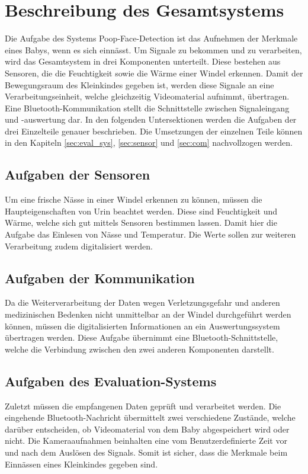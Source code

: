 \section{Beschreibung des Gesamtsystems}
\label{sec:Gesamtsystem}

Die Aufgabe des Systems Poop-Face-Detection ist das Aufnehmen der Merkmale eines Babys, wenn es sich einnässt. Um Signale zu bekommen und zu verarbeiten, wird das Gesamtsystem in drei Komponenten unterteilt. Diese bestehen aus Sensoren, die die Feuchtigkeit sowie die Wärme einer Windel erkennen. Damit der Bewegungsraum des Kleinkindes gegeben ist, werden diese Signale an eine Verarbeitungseinheit, welche gleichzeitig Videomaterial aufnimmt, übertragen. Eine Bluetooth-Kommunikation stellt die Schnittstelle zwischen Signaleingang und -auswertung dar. In den folgenden Untersektionen werden die Aufgaben der drei Einzelteile genauer beschrieben. Die Umsetzungen der einzelnen Teile können in den Kapiteln \ref{sec:eval_sys}, \ref{sec:sensor} und \ref{sec:com} nachvollzogen werden.

\subsection{Aufgaben der Sensoren}

Um eine frische Nässe in einer Windel erkennen zu können, müssen die Haupteigenschaften von Urin beachtet werden. Diese sind Feuchtigkeit und Wärme, welche sich gut mittels Sensoren bestimmen lassen. Damit hier die Aufgabe das Einlesen von Nässe und Temperatur. Die Werte sollen zur weiteren Verarbeitung zudem digitalisiert werden.

\subsection{Aufgaben der Kommunikation}

Da die Weiterverarbeitung der Daten wegen Verletzungsgefahr und anderen medizinischen Bedenken nicht unmittelbar an der Windel durchgeführt werden können, müssen die digitalisierten Informationen an ein Auswertungssystem übertragen werden. Diese Aufgabe übernimmt eine Bluetooth-Schnittstelle, welche die Verbindung zwischen den zwei anderen Komponenten darstellt.

\subsection{Aufgaben des Evaluation-Systems}

Zuletzt müssen die empfangenen Daten geprüft und verarbeitet werden. Die eingehende Bluetooth-Nachricht übermittelt zwei verschiedene Zustände, welche darüber entscheiden, ob Videomaterial von dem Baby abgespeichert wird oder nicht. Die Kameraaufnahmen beinhalten eine vom Benutzerdefinierte Zeit vor und nach dem Auslösen des Signals. Somit ist sicher, dass die Merkmale beim Einnässen eines Kleinkindes gegeben sind.



